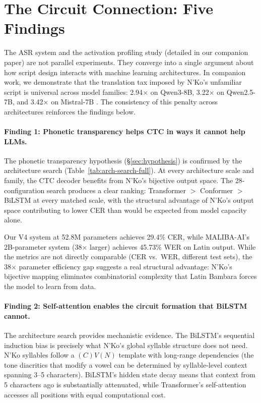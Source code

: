 \documentclass[11pt]{article}
\begin{document}
\section{The Circuit Connection: Five Findings}
\label{sec:findings}

The ASR system and the activation profiling study (detailed in our companion paper) are not parallel experiments.
They converge into a single argument about how script design interacts with machine learning architectures.
In companion work, we demonstrate that the translation tax imposed by N'Ko's unfamiliar script is universal across model families: 2.94$\times$ on Qwen3-8B, 3.22$\times$ on Qwen2.5-7B, and 3.42$\times$ on Mistral-7B \cite{diomande2026dead}.
The consistency of this penalty across architectures reinforces the findings below.

\paragraph{Finding 1: Phonetic transparency helps CTC in ways it cannot help LLMs.}
The phonetic transparency hypothesis (\S\ref{sec:hypothesis}) is confirmed by the architecture search (Table~\ref{tab:arch-search-full}).
At every architecture scale and family, the CTC decoder benefits from N'Ko's bijective output space.
The 28-configuration search produces a clear ranking: Transformer $>$ Conformer $>$ BiLSTM at every matched scale, with the structural advantage of N'Ko's output space contributing to lower CER than would be expected from model capacity alone.

Our V4 system at 52.8M parameters achieves 29.4\% CER, while MALIBA-AI's 2B-parameter system (38$\times$ larger) achieves 45.73\% WER on Latin output.
While the metrics are not directly comparable (CER vs.\ WER, different test sets), the 38$\times$ parameter efficiency gap suggests a real structural advantage: N'Ko's bijective mapping eliminates combinatorial complexity that Latin Bambara forces the model to learn from data.

\paragraph{Finding 2: Self-attention enables the circuit formation that BiLSTM cannot.}
The architecture search provides mechanistic evidence.
The BiLSTM's sequential induction bias is precisely what N'Ko's global syllable structure does not need.
N'Ko syllables follow a $(C)V(N)$ template with long-range dependencies (the tone diacritics that modify a vowel can be determined by syllable-level context spanning 3--5 characters).
BiLSTM's hidden state decay means that context from 5 characters ago is substantially attenuated, while Transformer's self-attention accesses all positions with equal computational cost.
\end{document}
